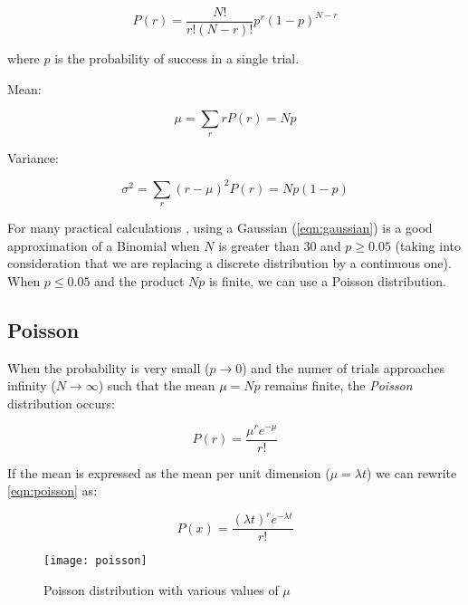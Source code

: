 \begin{equation}
	P(r)= \frac{N! }{ r! \left( N-r \right)! } p^r (1-p)^{N-r}
\end{equation}

where $p$ is the probability of success in a single trial.


Mean:

\begin{equation}
	\mu = \sum_{r}rP(r) = Np
\end{equation}

Variance:

\begin{equation}
	\sigma^2=\sum_r(r-\mu)^2P(r) = Np(1-p)
\end{equation}

For many practical calculations \cite{leo2012techniques}, using a Gaussian (\ref{eqn:gaussian}) is a good approximation of a Binomial when $N$ is greater than 30 and $p\geq0.05$ (taking into consideration that we are replacing a discrete distribution by a continuous one). When $p\leq0.05$ and the product $Np$ is finite, we can use a Poisson distribution.

\subsection{Poisson}
\label{distributions1}

When the probability is very small ($p \rightarrow 0$) and the numer of trials approaches infinity ($N \rightarrow \infty$) such that the mean $\mu = N p$ remains finite, the \textit{Poisson} distribution occurs:


\begin{equation}
	\label{eqn:poisson}
	P\left( r \right) = \frac{{\mu^{ r } e ^{-\mu} }}{{r!}}
\end{equation}

If the mean is expressed as the mean per unit dimension ($\mu = \lambda t$) we can rewrite \ref{eqn:poisson} as:

\begin{equation}
	P\left( x \right) = \frac{(\lambda t) ^r {e^{ - \lambda t}} }{{r!}}
\end{equation}

\begin{figure}
	\centerline{
		\texttt{[image: poisson]}}
	\caption{Poisson distribution with various values of $\mu$ \cite{leo2012techniques}}
\end{figure}

